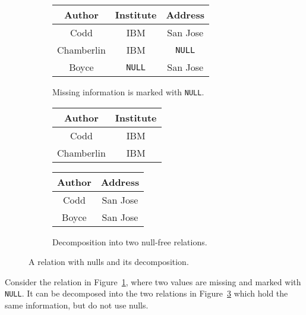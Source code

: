 \documentclass[sigconf]{acmart}
\begin{document}

\begin{figure}
\begin{subfigure}{\linewidth}
\centering
\begin{tabular}{|c|c|c|}
\hline
\textsf{Author} & \textsf{Institute} & \textsf{Address} \\ 
\hline
Codd & IBM & San Jose \\
Chamberlin & IBM & \lstinline|NULL| \\
Boyce & \lstinline|NULL| & San Jose \\
\hline
\end{tabular}
\caption{Missing information is marked with \lstinline|NULL|.}
\label{fig:table-null}
\vspace{1em}
\end{subfigure}
\begin{subfigure}{\linewidth}
\centering
\begin{tabular}{|c|c|}
\hline
\textsf{Author} & \textsf{Institute} \\
\hline
Codd & IBM \\
Chamberlin & IBM \\
\hline
\end{tabular}
\hspace{1em}
\begin{tabular}{|c|c|}
\hline
\textsf{Author} & \textsf{Address} \\ 
\hline
Codd & San Jose \\
Boyce & San Jose \\
\hline
\end{tabular}
\caption{Decomposition into two null-free relations.}
\label{fig:table-normalized}
\end{subfigure}
\caption{A relation with nulls and its decomposition.}
\end{figure}

\begin{example}
\label{ex:normalization}
Consider the relation in Figure~\ref{fig:table-null}, 
 where two values are missing and marked with \lstinline|NULL|.
It can be decomposed into the two relations in Figure~\ref{fig:table-normalized}
 which hold the same information, but do not use nulls.
\end{example}
\end{document}
